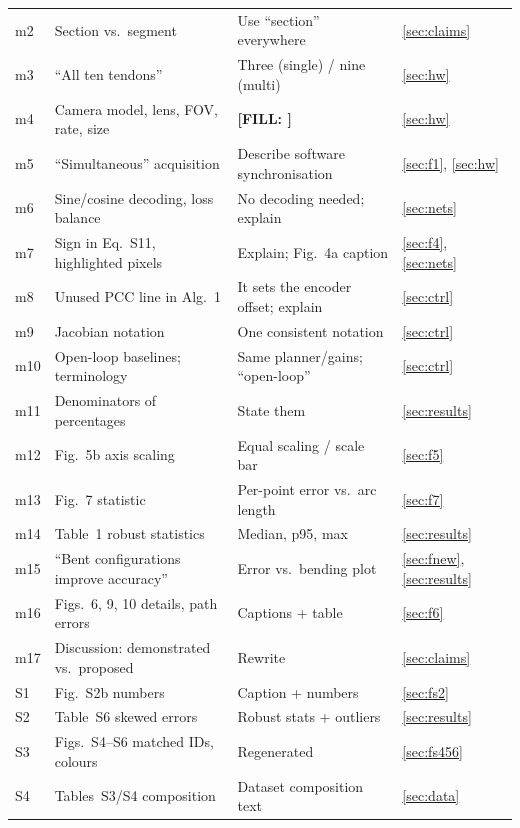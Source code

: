 \documentclass[10pt,a4paper]{article}
\newcommand{\FILL}[1]{\textcolor{orange!85!black}{\textbf{[FILL: #1]}}}
\begin{document}
\begin{longtable}{p{0.8cm}p{6.4cm}p{6.3cm}p{1.6cm}}
m2 & Section vs.\ segment & Use ``section'' everywhere & \ref{sec:claims}\\
m3 & ``All ten tendons'' & Three (single) / nine (multi) & \ref{sec:hw}\\
m4 & Camera model, lens, FOV, rate, size & \FILL{} & \ref{sec:hw}\\
m5 & ``Simultaneous'' acquisition & Describe software synchronisation & \ref{sec:f1}, \ref{sec:hw}\\
m6 & Sine/cosine decoding, loss balance & No decoding needed; explain & \ref{sec:nets}\\
m7 & Sign in Eq.~S11, highlighted pixels & Explain; Fig.~4a caption & \ref{sec:f4}, \ref{sec:nets}\\
m8 & Unused PCC line in Alg.~1 & It sets the encoder offset; explain & \ref{sec:ctrl}\\
m9 & Jacobian notation & One consistent notation & \ref{sec:ctrl}\\
m10 & Open-loop baselines; terminology & Same planner/gains; ``open-loop'' & \ref{sec:ctrl}\\
m11 & Denominators of percentages & State them & \ref{sec:results}\\
m12 & Fig.~5b axis scaling & Equal scaling / scale bar & \ref{sec:f5}\\
m13 & Fig.~7 statistic & Per-point error vs.\ arc length & \ref{sec:f7}\\
m14 & Table~1 robust statistics & Median, p95, max & \ref{sec:results}\\
m15 & ``Bent configurations improve accuracy'' & Error vs.\ bending plot & \ref{sec:fnew}, \ref{sec:results}\\
m16 & Figs.~6, 9, 10 details, path errors & Captions + table & \ref{sec:f6}\\
m17 & Discussion: demonstrated vs.\ proposed & Rewrite & \ref{sec:claims}\\\midrule
S1 & Fig.~S2b numbers & Caption + numbers & \ref{sec:fs2}\\
S2 & Table~S6 skewed errors & Robust stats + outliers & \ref{sec:results}\\
S3 & Figs.~S4--S6 matched IDs, colours & Regenerated & \ref{sec:fs456}\\
S4 & Tables~S3/S4 composition & Dataset composition text & \ref{sec:data}\\
\bottomrule
\end{longtable}
\normalsize

\clearpage
\end{document}
